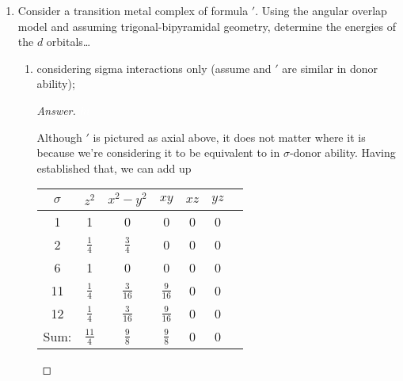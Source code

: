 \documentclass[../psets.tex]{subfiles}
\begin{document}
\begin{enumerate}[label={\Roman*)}]
\begin{enumerate}[label={\textbf{10.\arabic*}}]
\begin{proof}[Answer]
        \end{proof}
        \newpage
        \item Consider a transition metal complex of formula $'$. Using the angular overlap model and assuming trigonal-bipyramidal geometry, determine the energies of the $d$ orbitals\dots
        \begin{enumerate}[label={\textbf{\alph*.}}]
            \item considering sigma interactions only (assume  and $'$ are similar in donor ability);
            \begin{proof}[Answer]
                ${\color{white}hi}$
                \begin{center}
                \end{center}
                \vspace{1em}
                Although $'$ is pictured as axial above, it does not matter where it is because we're considering it to be equivalent to  in $\sigma$-donor ability. Having established that, we can add up
                \begin{center}
                    \small
                    \renewcommand{\arraystretch}{1.4}
                    \begin{tabular}{c|cccccc}
                        $\sigma$ & $z^2$ & $x^2-y^2$ & $xy$ & $xz$ & $yz$\\
                        \hline
                        1 & 1 & 0 & 0 & 0 & 0\\
                        2 & $\frac{1}{4}$ & $\frac{3}{4}$ & 0 & 0 & 0\\
                        6 & 1 & 0 & 0 & 0 & 0\\
                        11 & $\frac{1}{4}$ & $\frac{3}{16}$ & $\frac{9}{16}$ & 0 & 0\\
                        12 & $\frac{1}{4}$ & $\frac{3}{16}$ & $\frac{9}{16}$ & 0 & 0\\
                        \hline
                        Sum: & $\frac{11}{4}$ & $\frac{9}{8}$ & $\frac{9}{8}$ & 0 & 0\\
                    \end{tabular}

\end{center}
\end{proof}
\end{enumerate}
\end{enumerate}
\end{enumerate}
\end{document}
